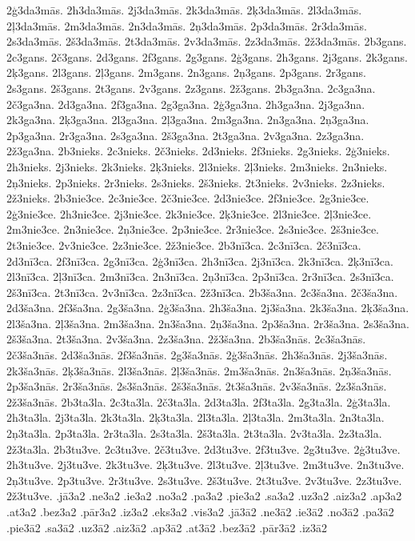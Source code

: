 {2ģ3da3mās.
2h3da3mās.
2j3da3mās.
2k3da3mās.
2ķ3da3mās.
2l3da3mās.
2ļ3da3mās.
2m3da3mās.
2n3da3mās.
2ņ3da3mās.
2p3da3mās.
2r3da3mās.
2s3da3mās.
2š3da3mās.
2t3da3mās.
2v3da3mās.
2z3da3mās.
2ž3da3mās.
2b3gans.
2c3gans.
2č3gans.
2d3gans.
2f3gans.
2g3gans.
2ģ3gans.
2h3gans.
2j3gans.
2k3gans.
2ķ3gans.
2l3gans.
2ļ3gans.
2m3gans.
2n3gans.
2ņ3gans.
2p3gans.
2r3gans.
2s3gans.
2š3gans.
2t3gans.
2v3gans.
2z3gans.
2ž3gans.
2b3ga3na.
2c3ga3na.
2č3ga3na.
2d3ga3na.
2f3ga3na.
2g3ga3na.
2ģ3ga3na.
2h3ga3na.
2j3ga3na.
2k3ga3na.
2ķ3ga3na.
2l3ga3na.
2ļ3ga3na.
2m3ga3na.
2n3ga3na.
2ņ3ga3na.
2p3ga3na.
2r3ga3na.
2s3ga3na.
2š3ga3na.
2t3ga3na.
2v3ga3na.
2z3ga3na.
2ž3ga3na.
2b3nieks.
2c3nieks.
2č3nieks.
2d3nieks.
2f3nieks.
2g3nieks.
2ģ3nieks.
2h3nieks.
2j3nieks.
2k3nieks.
2ķ3nieks.
2l3nieks.
2ļ3nieks.
2m3nieks.
2n3nieks.
2ņ3nieks.
2p3nieks.
2r3nieks.
2s3nieks.
2š3nieks.
2t3nieks.
2v3nieks.
2z3nieks.
2ž3nieks.
2b3nie3ce.
2c3nie3ce.
2č3nie3ce.
2d3nie3ce.
2f3nie3ce.
2g3nie3ce.
2ģ3nie3ce.
2h3nie3ce.
2j3nie3ce.
2k3nie3ce.
2ķ3nie3ce.
2l3nie3ce.
2ļ3nie3ce.
2m3nie3ce.
2n3nie3ce.
2ņ3nie3ce.
2p3nie3ce.
2r3nie3ce.
2s3nie3ce.
2š3nie3ce.
2t3nie3ce.
2v3nie3ce.
2z3nie3ce.
2ž3nie3ce.
2b3nī3ca.
2c3nī3ca.
2č3nī3ca.
2d3nī3ca.
2f3nī3ca.
2g3nī3ca.
2ģ3nī3ca.
2h3nī3ca.
2j3nī3ca.
2k3nī3ca.
2ķ3nī3ca.
2l3nī3ca.
2ļ3nī3ca.
2m3nī3ca.
2n3nī3ca.
2ņ3nī3ca.
2p3nī3ca.
2r3nī3ca.
2s3nī3ca.
2š3nī3ca.
2t3nī3ca.
2v3nī3ca.
2z3nī3ca.
2ž3nī3ca.
2b3ša3na.
2c3ša3na.
2č3ša3na.
2d3ša3na.
2f3ša3na.
2g3ša3na.
2ģ3ša3na.
2h3ša3na.
2j3ša3na.
2k3ša3na.
2ķ3ša3na.
2l3ša3na.
2ļ3ša3na.
2m3ša3na.
2n3ša3na.
2ņ3ša3na.
2p3ša3na.
2r3ša3na.
2s3ša3na.
2š3ša3na.
2t3ša3na.
2v3ša3na.
2z3ša3na.
2ž3ša3na.
2b3ša3nās.
2c3ša3nās.
2č3ša3nās.
2d3ša3nās.
2f3ša3nās.
2g3ša3nās.
2ģ3ša3nās.
2h3ša3nās.
2j3ša3nās.
2k3ša3nās.
2ķ3ša3nās.
2l3ša3nās.
2ļ3ša3nās.
2m3ša3nās.
2n3ša3nās.
2ņ3ša3nās.
2p3ša3nās.
2r3ša3nās.
2s3ša3nās.
2š3ša3nās.
2t3ša3nās.
2v3ša3nās.
2z3ša3nās.
2ž3ša3nās.
2b3ta3la.
2c3ta3la.
2č3ta3la.
2d3ta3la.
2f3ta3la.
2g3ta3la.
2ģ3ta3la.
2h3ta3la.
2j3ta3la.
2k3ta3la.
2ķ3ta3la.
2l3ta3la.
2ļ3ta3la.
2m3ta3la.
2n3ta3la.
2ņ3ta3la.
2p3ta3la.
2r3ta3la.
2s3ta3la.
2š3ta3la.
2t3ta3la.
2v3ta3la.
2z3ta3la.
2ž3ta3la.
2b3tu3ve.
2c3tu3ve.
2č3tu3ve.
2d3tu3ve.
2f3tu3ve.
2g3tu3ve.
2ģ3tu3ve.
2h3tu3ve.
2j3tu3ve.
2k3tu3ve.
2ķ3tu3ve.
2l3tu3ve.
2ļ3tu3ve.
2m3tu3ve.
2n3tu3ve.
2ņ3tu3ve.
2p3tu3ve.
2r3tu3ve.
2s3tu3ve.
2š3tu3ve.
2t3tu3ve.
2v3tu3ve.
2z3tu3ve.
2ž3tu3ve.
.jā3a2
.ne3a2
.ie3a2
.no3a2
.pa3a2
.pie3a2
.sa3a2
.uz3a2
.aiz3a2
.ap3a2
.at3a2
.bez3a2
.pār3a2
.iz3a2
.eks3a2
.vis3a2
.jā3ā2
.ne3ā2
.ie3ā2
.no3ā2
.pa3ā2
.pie3ā2
.sa3ā2
.uz3ā2
.aiz3ā2
.ap3ā2
.at3ā2
.bez3ā2
.pār3ā2
.iz3ā2
}
